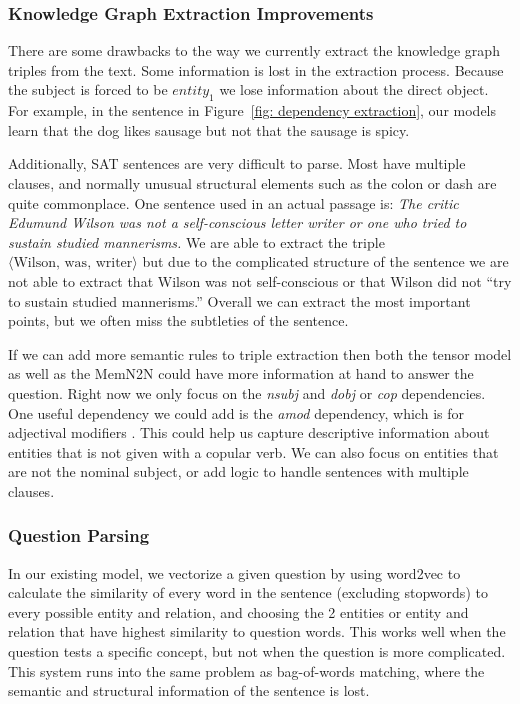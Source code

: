 \documentclass[pageno]{final_paper}
\begin{document}
\subsubsection{Knowledge Graph Extraction Improvements}
\label{Knowledge Graph Extraction Improvements}

There are some drawbacks to the way we currently extract the knowledge graph
triples from the text. Some information is lost in the extraction process.
Because the subject is forced to be $entity_1$ we lose information about the
direct object. For example, in the sentence in Figure~\ref{fig: dependency
extraction}, our models learn that the dog likes sausage but not that the
sausage is spicy.

Additionally, SAT sentences are very difficult to parse. Most have multiple
clauses, and normally unusual structural elements such as the colon or dash are
quite commonplace. One sentence used in an actual passage is: \textit{The critic
Edumund Wilson was not a self-conscious letter writer or one who tried to
sustain studied mannerisms.} We are able to extract the triple $\langle
\text{Wilson}, \,\text{was}, \,\text{writer} \rangle$ but due to the complicated
structure of the sentence we are not able to extract that Wilson was not
self-conscious or that Wilson did not ``try to sustain studied mannerisms.''
Overall we can extract the most important points, but we often miss the
subtleties of the sentence.

If we can add more semantic rules to triple extraction then both the tensor
model as well as the MemN2N could have more information at hand to answer the
question. Right now we only focus on the \textit{nsubj} and \textit{dobj} or
\textit{cop} dependencies. One useful dependency we could add is the
\textit{amod} dependency, which is for adjectival modifiers \cite{De2014}. This
could help us capture descriptive information about entities that is not given
with a copular verb. We can also focus on entities that are not the nominal
subject, or add logic to handle sentences with multiple clauses.

\subsubsection{Question Parsing}
\label{Question Parsing}

In our existing model, we vectorize a given question by using word2vec to
calculate the similarity of every word in the sentence (excluding stopwords) to
every possible entity and relation, and choosing the 2 entities or entity and
relation that have highest similarity to question words. This works well when
the question tests a specific concept, but not when the question is more
complicated. This system runs into the same problem as bag-of-words matching,
where the semantic and structural information of the sentence is lost.
\end{document}
